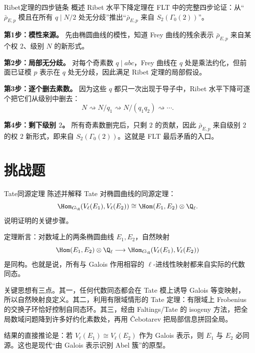\begin{problem}{Ribet定理的四步链条}
概述 Ribet 水平下降定理在 FLT 中的完整四步论证：从“$\bar\rho_{E,p}$ 模且在所有 $q\mid N/2$ 处无分歧”推出“$\bar\rho_{E,p}$ 来自 $S_2(\Gamma_0(2))$”。
\end{problem}
\begin{solution}
\textbf{第1步：模性来源。} 先由椭圆曲线的模性，知道 Frey 曲线的残余表示 $\bar\rho_{E,p}$ 来自某个权 $2$、级别 $N$ 的新形式。

\textbf{第2步：局部无分歧。} 对每个奇素数 $q\mid abc$，Frey 曲线在 $q$ 处是乘法约化，但前面已证模 $p$ 表示在 $q$ 处无分歧，因此满足 Ribet 定理的局部假设。

\textbf{第3步：逐个删去素数。} 因为这些 $q$ 都只一次出现于导子中，Ribet 水平下降可逐个把它们从级别中删去：
\[
N\rightsquigarrow N/q_1\rightsquigarrow N/(q_1q_2)\rightsquigarrow\cdots.
\]

\textbf{第4步：剩下级别 $2$。} 所有奇素数删完后，只剩 $2$ 的贡献，因此 $\bar\rho_{E,p}$ 来自级别 $2$ 的权 $2$ 新形式，即来自 $S_2(\Gamma_0(2))$。这就是 FLT 最后矛盾的入口。
\end{solution}

\section{挑战题 \hard}

\begin{problem}{Tate同源定理}
陈述并解释 Tate 对椭圆曲线的同源定理：
\[
\Hom_{G_\Q}(V_\ell(E_1),V_\ell(E_2))\cong \Hom(E_1,E_2)\otimes\Q_\ell.
\]
说明证明的关键步骤。
\end{problem}
\begin{solution}
定理断言：对数域上的两条椭圆曲线 $E_1,E_2$，自然映射
\[
\Hom(E_1,E_2)\otimes\Q_\ell \longrightarrow \Hom_{G_\Q}(V_\ell(E_1),V_\ell(E_2))
\]
是同构。也就是说，所有与 Galois 作用相容的 $\ell$-进线性映射都来自实际的代数同态。

关键思想有三点。其一，任何代数同态都会在 Tate 模上诱导 Galois 等变映射，所以自然映射良定义。其二，利用有限域情形的 Tate 定理：有限域上 Frobenius 的交换子环恰好控制自同态环。其三，经由 Faltings/Tate 的 isogeny 方法，把全局数域问题降到许多好约化素数处，再用 Čebotarev 把局部信息拼回全局。

结果的直接推论是：若 $V_\ell(E_1)\cong V_\ell(E_2)$ 作为 Galois 表示，则 $E_1$ 与 $E_2$ 必同源。这也是现代“由 Galois 表示识别 Abel 簇”的原型。
\end{solution}

